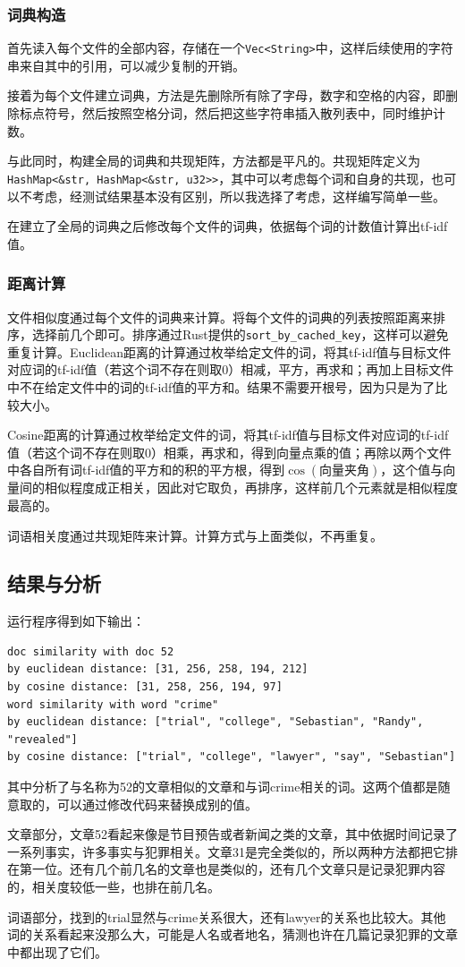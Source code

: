 \documentclass[12pt, UTF8]{article}
\begin{document}
\subsubsection{词典构造}

首先读入每个文件的全部内容，存储在一个\lstinline{Vec<String>}中，这样后续使用的字符串来自其中的引用，可以减少复制的开销。

接着为每个文件建立词典，方法是先删除所有除了字母，数字和空格的内容，即删除标点符号，然后按照空格分词，然后把这些字符串插入散列表中，同时维护计数。

与此同时，构建全局的词典和共现矩阵，方法都是平凡的。共现矩阵定义为\lstinline{HashMap<&str, HashMap<&str, u32>>}，其中可以考虑每个词和自身的共现，也可以不考虑，经测试结果基本没有区别，所以我选择了考虑，这样编写简单一些。

在建立了全局的词典之后修改每个文件的词典，依据每个词的计数值计算出tf-idf值。

\subsubsection{距离计算}

文件相似度通过每个文件的词典来计算。将每个文件的词典的列表按照距离来排序，选择前几个即可。排序通过Rust提供的\lstinline|sort_by_cached_key|，这样可以避免重复计算。Euclidean距离的计算通过枚举给定文件的词，将其tf-idf值与目标文件对应词的tf-idf值（若这个词不存在则取0）相减，平方，再求和；再加上目标文件中不在给定文件中的词的tf-idf值的平方和。结果不需要开根号，因为只是为了比较大小。

Cosine距离的计算通过枚举给定文件的词，将其tf-idf值与目标文件对应词的tf-idf值（若这个词不存在则取0）相乘，再求和，得到向量点乘的值；再除以两个文件中各自所有词tf-idf值的平方和的积的平方根，得到$\cos(\text{向量夹角})$，这个值与向量间的相似程度成正相关，因此对它取负，再排序，这样前几个元素就是相似程度最高的。

词语相关度通过共现矩阵来计算。计算方式与上面类似，不再重复。

\subsection{结果与分析}

运行程序得到如下输出：

\begin{lstlisting}
doc similarity with doc 52
by euclidean distance: [31, 256, 258, 194, 212]
by cosine distance: [31, 258, 256, 194, 97]
word similarity with word "crime"
by euclidean distance: ["trial", "college", "Sebastian", "Randy", "revealed"]
by cosine distance: ["trial", "college", "lawyer", "say", "Sebastian"]
\end{lstlisting}

其中分析了与名称为52的文章相似的文章和与词crime相关的词。这两个值都是随意取的，可以通过修改代码来替换成别的值。

文章部分，文章52看起来像是节目预告或者新闻之类的文章，其中依据时间记录了一系列事实，许多事实与犯罪相关。文章31是完全类似的，所以两种方法都把它排在第一位。还有几个前几名的文章也是类似的，还有几个文章只是记录犯罪内容的，相关度较低一些，也排在前几名。

词语部分，找到的trial显然与crime关系很大，还有lawyer的关系也比较大。其他词的关系看起来没那么大，可能是人名或者地名，猜测也许在几篇记录犯罪的文章中都出现了它们。
\end{document}
